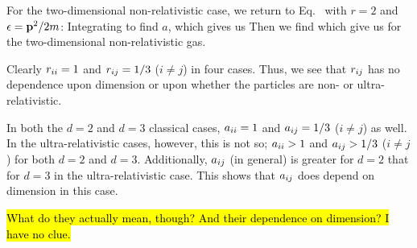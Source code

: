 {	For the two-dimensional non-relativistic case, we return to Eq.~ with $r=2$ and $\epsilon = \vb{p}^2/2m$:
	Integrating to find $a$,
	which gives us
	Then we find
	which give us
	for the two-dimensional non-relativistic gas.
	
	Clearly $r_{ii} = 1$ and $r_{ij} = 1/3$ ($i \neq j$) in four cases.  Thus, we see that $r_{ij}$ has no dependence upon dimension or upon whether the particles are non- or ultra-relativistic.
	
	In both the $d = 2$ and $d = 3$ classical cases, $a_{ii} = 1$ and $a_{ij} = 1/3$ ($i \neq j$) as well.  In the ultra-relativistic cases, however, this is not so; $a_{ii} > 1$ and $a_{ij} > 1/3$ ($i \neq j$) for both $d = 2$ and $d = 3$.  Additionally, $a_{ij}$ (in general) is greater for $d = 2$ that for $d = 3$ in the ultra-relativistic case.  This shows that $a_{ij}$ does depend on dimension in this case.
	
	\hl{What do they actually mean, though?  And their dependence on dimension?  I have no clue.}
}
